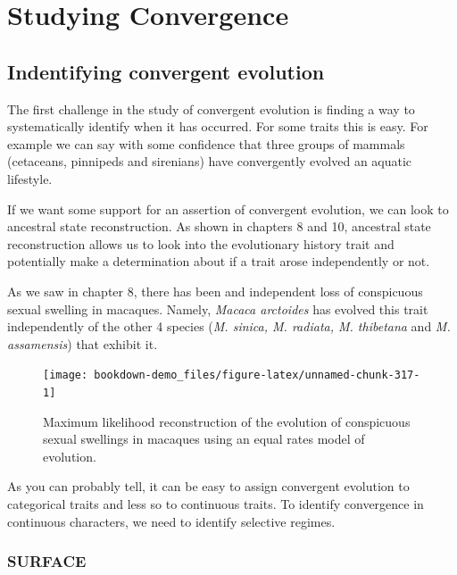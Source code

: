 \documentclass[
]{book}
\begin{document}
\hypertarget{convergence}{%
\chapter{Studying Convergence}\label{convergence}}

\hypertarget{indentifying-convergent-evolution}{%
\section{Indentifying convergent evolution}\label{indentifying-convergent-evolution}}

The first challenge in the study of convergent evolution is finding a way to systematically identify when it has occurred. For some traits this is easy. For example we can say with some confidence that three groups of mammals (cetaceans, pinnipeds and sirenians) have convergently evolved an aquatic lifestyle.

If we want some support for an assertion of convergent evolution, we can look to ancestral state reconstruction. As shown in chapters 8 and 10, ancestral state reconstruction allows us to look into the evolutionary history trait and potentially make a determination about if a trait arose independently or not.

As we saw in chapter 8, there has been and independent loss of conspicuous sexual swelling in macaques. Namely, \emph{Macaca arctoides} has evolved this trait independently of the other 4 species (\emph{M. sinica, M. radiata, M. thibetana} and \emph{M. assamensis}) that exhibit it.

\begin{figure}[H]

{\centering \texttt{[image: bookdown-demo\_files/figure-latex/unnamed-chunk-317-1]} 

}

\caption{Maximum likelihood reconstruction of the evolution of conspicuous sexual swellings in macaques using an equal rates model of evolution.}\label{fig:unnamed-chunk-317}
\end{figure}

As you can probably tell, it can be easy to assign convergent evolution to categorical traits and less so to continuous traits. To identify convergence in continuous characters, we need to identify selective regimes.

\hypertarget{surface}{%
\subsection{SURFACE}\label{surface}}
\end{document}
